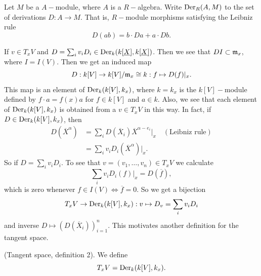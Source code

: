 \begin{dang}
    \begin{notation}
        Let $M$ be a $A-$module, where $A$ is a $R-$algebra. Write $\text{Der}_R(A,M)$ 
        to the set of derivations $D: A\to M$. That is, $R-$module morphisms satisfying the Leibniz rule 
        \begin{equation}
            D(ab) = b\cdot Da + a\cdot Db.
        \end{equation}
    \end{notation}
\end{dang}
If $v\in T_x V$ and $D = \sum_i v_i D_i\in\text{Der}_k(k[\underline{X}],k[\underline{X}])$. Then we see that 
$D I \subset \mathfrak{m}_x$, where $I=I(V)$. Then we get an induced map  
\begin{equation}
    D: k[V] \rightarrow k[V]/\mathfrak{m}_x\cong k: f\mapsto D(f)|_x.
\end{equation} 
This map is an element of $\text{Der}_k(k[V], k_x)$, where $k=k_x$ is the $k[V]-$module defined by $f\cdot a = f(x)a$
for $f\in k[V]$ and $a\in k$. Also, we see that each element of $\text{Der}_k(k[V], k_x)$ is obtained from 
a $v\in T_xV$ in this way. In fact, if $D\in \text{Der}_k(k[V],k_x)$, then 
\begin{equation}
    \begin{split}
        D(\overline{X}^\alpha) &= \sum_i D(\overline{X}_i) \overline{X}^{\alpha-e_i}\big|_x\quad(\text{Leibniz rule})\\ 
        &=\sum_i v_i D_i(\overline{X}^\alpha)\big|_x.
    \end{split}
\end{equation}
So if $D = \sum_i v_i D_i$. To see that $v = (v_1,\dots, v_n)\in T_xV$ we calculate 
\begin{equation}
    \sum_i v_i D_i(f) |_x = D(\overline{f}),
\end{equation}
which is zero whenever $f\in I(V)\iff \overline{f}=0$. So we get a bijection 
\begin{equation}
    T_x V \rightarrow \text{Der}_k(k[V],k_x): v\mapsto D_v = \sum_i v_iD_i 
\end{equation}
and inverse $D\mapsto (D(\overline{X}_i))_{i=1}^n$. This motivates another definition for the tangent space. 
\begin{dang}
    \begin{definition}
        (Tangent space, definition 2). We define 
        \begin{equation}
            T_x V = \text{Der}_k(k[V],k_x).
        \end{equation}
    \end{definition}
\end{dang}

